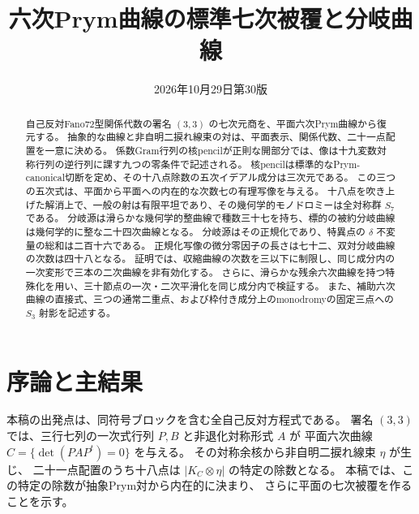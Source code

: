 
\title{六次Prym曲線の標準七次被覆と分岐曲線}
\author{}\date{2026年10月29日\quad 第30版}

\maketitle
\begin{abstract}
自己反対Fano72型関係代数の署名 $(3,3)$ の七次元商を、平面六次Prym曲線から復元する。
抽象的な曲線と非自明二捩れ線束の対は、平面表示、関係代数、二十一点配置を一意に決める。
係数Gram行列の核pencilが正則な開部分では、像は十九変数対称行列の逆行列に課す九つの零条件で記述される。
核pencilは標準的なPrym-canonical切断を定め、その十八点除数の五次イデアル成分は三次元である。
この三つの五次式は、平面から平面への内在的な次数七の有理写像を与える。
十八点を吹き上げた解消上で、一般の射は有限平坦であり、その幾何学的モノドロミーは全対称群 $S_7$ である。
分岐源は滑らかな幾何学的整曲線で種数三十七を持ち、標的の被約分岐曲線は幾何学的に整な二十四次曲線となる。
分岐源はその正規化であり、特異点の $\delta$ 不変量の総和は二百十六である。
正規化写像の微分零因子の長さは七十二、双対分岐曲線の次数は四十八となる。
証明では、収縮曲線の次数を三以下に制限し、同じ成分内の一次変形で三本の二次曲線を非有効化する。
さらに、滑らかな残余六次曲線を持つ特殊化を用い、三十節点の一次・二次平滑化を同じ成分内で検証する。
また、補助六次曲線の直接式、三つの通常二重点、および枠付き成分上のmonodromyの固定三点への $S_3$ 射影を記述する。
\end{abstract}
\begingroup\small\setlength{\parskip}{0pt}\tableofcontents\endgroup
\clearpage

\section{序論と主結果}

本稿の出発点は、同符号ブロックを含む全自己反対方程式である。
署名 $(3,3)$ では、三行七列の一次式行列 $P,B$ と非退化対称形式 $A$ が
平面六次曲線 $C=\{\det(PAP^t)=0\}$ を与える。
その対称余核から非自明二捩れ線束 $\eta$ が生じ、
二十一点配置のうち十八点は $|K_C\otimes\eta|$ の特定の除数となる。
本稿では、この特定の除数が抽象Prym対から内在的に決まり、
さらに平面の七次被覆を作ることを示す。

